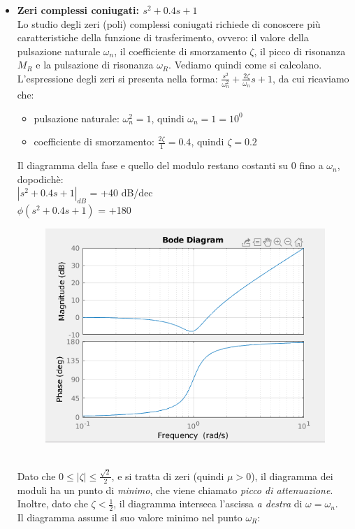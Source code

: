 \documentclass[12pt,a4paper]{article}
\begin{document}
\begin{itemize}
\begin{figure}[h!]
		\end{figure}
		\item \textbf{Zeri complessi coniugati: $s^2 + 0.4s+1$}\vspace{5px}\\
		Lo studio degli zeri (poli) complessi coniugati richiede di conoscere pi\`u caratteristiche della funzione di trasferimento, ovvero: il valore della pulsazione naturale $\omega_n$, il coefficiente di smorzamento $\zeta$, il picco di risonanza $M_R$ e la pulsazione di risonanza $\omega_R$. Vediamo quindi come si calcolano.\\
		L'espressione degli zeri si presenta nella forma: $\frac{s^2}{\omega_n^2} + \frac{2\zeta}{\omega_n}s + 1$, da cui ricaviamo che:
		\begin{itemize}
			\item pulsazione naturale: $\omega_n^2 = 1$, quindi $\omega_n = 1 = 10^0$
			\item coefficiente di smorzamento: $\frac{2\zeta}{1} = 0.4$, quindi $\zeta = 0.2$
		\end{itemize} 
		Il diagramma della fase e quello del modulo restano costanti su 0 fino a $\omega_n$, dopodich\`e:\\
		$|s^2 + 0.4s+1|_{dB}$ = +40 dB/dec\\
		$\phi(s^2 + 0.4s+1)$ = +180\degree
		\begin{figure}[h!]
			\centering
			\includegraphics[scale=0.5]{./images/bode41_2.png}
		\end{figure}
		\vspace{5px}\\Dato che $0 \leq |\zeta| \leq \frac{\sqrt{2}}{2}$, e si tratta di zeri (quindi $\mu > 0$), il diagramma dei moduli ha un punto di \textit{minimo}, che viene chiamato \textit{picco di attenuazione}.\\Inoltre, dato che $\zeta < \frac{1}{2}$, il diagramma interseca l'ascissa \textit{a destra} di $\omega = \omega_n$.\\Il diagramma assume il suo valore minimo nel punto $\omega_R$:

\end{itemize}
\end{document}
